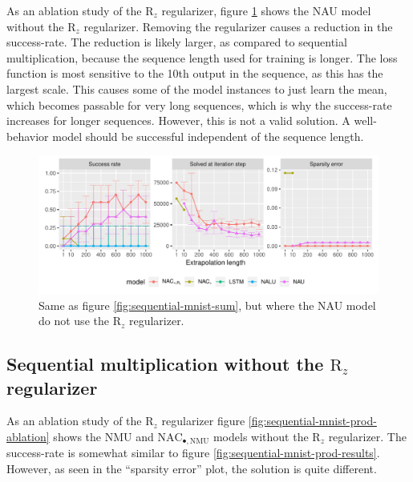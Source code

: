 As an ablation study of the $\mathrm{R}_z$ regularizer, figure \ref{fig:sequential-mnist-sum-ablation} shows the NAU model without the $\mathrm{R}_z$ regularizer. Removing the regularizer causes a reduction in the success-rate. The reduction is likely larger, as compared to sequential multiplication, because the sequence length used for training is longer. The loss function is most sensitive to the 10th output in the sequence, as this has the largest scale. This causes some of the model instances to just learn the mean, which becomes passable for very long sequences, which is why the success-rate increases for longer sequences. However, this is not a valid solution. A well-behavior model should be successful independent of the sequence length.

\begin{figure}[H]
\centering
\includegraphics[width=\linewidth,trim={0 0.5cm 0 0},clip]{paper/results/sequential_mnist_sum_long_ablation.pdf}
\caption{Same as figure \ref{fig:sequential-mnist-sum}, but where the NAU model do not use the $\mathrm{R}_z$ regularizer.} 
\label{fig:sequential-mnist-sum-ablation}
\end{figure}

\subsection{Sequential multiplication without the \texorpdfstring{$\mathrm{R}_z$}{R\_z} regularizer}
\label{sec:appendix:sequential-mnist:ablation}

As an ablation study of the $\mathrm{R}_z$ regularizer figure \ref{fig:sequential-mnist-prod-ablation} shows the NMU and $\mathrm{NAC}_{\bullet,\mathrm{NMU}}$ models without the $\mathrm{R}_z$ regularizer. The success-rate is somewhat similar to figure \ref{fig:sequential-mnist-prod-results}. However, as seen in the ``sparsity error'' plot, the solution is quite different.

